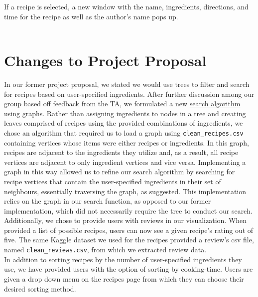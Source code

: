 \documentclass[fontsize=11pt]{article}
\begin{document}
    If a recipe is selected, a new window with the name, ingredients, directions, and time for the recipe as well as the author's name pops up. \\

    \cite{insert_images_latex}\\




    \section*{Changes to Project Proposal}

    In our former project proposal, we stated we would use trees to filter and search for recipes based on user-specified ingredients. After further discussion among our group based off feedback from the TA, we formulated a new \hyperref[sec:algo]{search algorithm} using graphs. Rather than assigning ingredients to nodes in a tree and creating leaves comprised of recipes using the provided combinations of ingredients, we chose an algorithm that required us to load a graph using \texttt{clean\_recipes.csv} containing vertices whose items were either recipes or ingredients. In this graph, recipes are adjacent to the ingredients they utilize and, as a result, all recipe vertices are adjacent to only ingredient vertices and vice versa. Implementing a graph in this way allowed us to refine our search algorithm by searching for recipe vertices that contain the user-specified ingredients in their set of neighbours, essentially traversing the graph, as suggested. This implementation relies on the graph in our search function, as opposed to our former implementation, which did not necessarily require the tree to conduct our search. \\

    Additionally, we chose to provide users with reviews in our visualization. When provided a list of possible recipes, users can now see a given recipe's rating out of five. The same Kaggle dataset we used for the recipes provided a review's csv file, named \texttt{clean\_reviews.csv}, from which we extracted review data. \\

    In addition to sorting recipes by the number of user-specified ingredients they use, we have provided users with the option of sorting by cooking-time. Users are given a drop down menu on the recipes page from which they can choose their desired sorting method. \\
\end{document}
